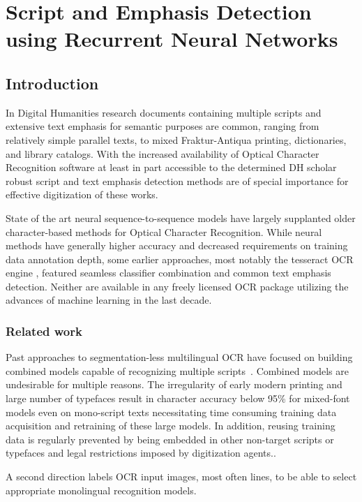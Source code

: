 \chapter{Script and Emphasis Detection using Recurrent Neural Networks}
\label{ch:multi}

\section{Introduction}

In Digital Humanities research documents containing multiple scripts and
extensive text emphasis for semantic purposes are common, ranging from
relatively simple parallel texts, to mixed Fraktur-Antiqua printing,
dictionaries, and library catalogs. With the increased availability of Optical
Character Recognition software at least in part accessible to the determined DH
scholar robust script and text emphasis detection methods are of special
importance for effective digitization of these works.

State of the art neural sequence-to-sequence models have largely supplanted
older character-based methods for Optical Character Recognition. While neural
methods have generally higher accuracy and decreased requirements on training
data annotation depth, some earlier approaches, most notably the tesseract OCR
engine \cite{smith2009adapting}, featured seamless classifier combination and
common text emphasis detection. Neither are available in any freely licensed
OCR package utilizing the advances of machine learning in the last decade.

\subsection{Related work}

Past approaches to segmentation-less multilingual OCR have focused on building
combined models capable of recognizing multiple scripts~\cite{ul2013can}.
Combined models are undesirable for multiple reasons. The irregularity of early
modern printing and large number of typefaces result in character accuracy
below 95\% for mixed-font models even on mono-script texts
\cite{springmann2016automatic} necessitating time consuming training data
acquisition and retraining of these large models. In addition, reusing training
data is regularly prevented by being embedded in other non-target scripts or
typefaces and legal restrictions imposed by digitization agents..

A second direction labels OCR input images, most often lines, to be able to
select appropriate monolingual recognition models. 

